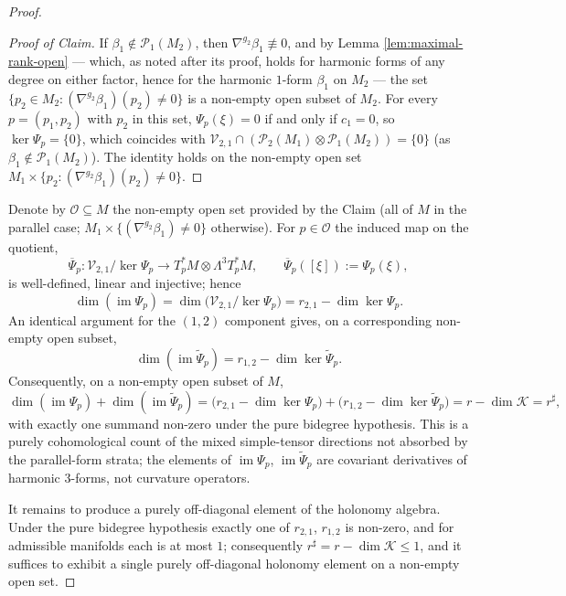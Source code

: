 \documentclass[11pt,reqno]{amsart}
\theoremstyle{plain}
\theoremstyle{definition}
\numberwithin{equation}{section}
\begin{document}
\begin{proof}
\begin{proof}[Proof of Claim]
If $\beta_1\notin\mathcal{P}_1(M_2)$, then $\nabla^{g_2}\beta_1\not\equiv 0$, and by
Lemma \ref{lem:maximal-rank-open} --- which, as noted after its proof, holds for
harmonic forms of any degree on either factor, hence for the harmonic $1$-form
$\beta_1$ on $M_2$ --- the set
$\{p_2\in M_2:(\nabla^{g_2}\beta_1)(p_2)\neq 0\}$ is a non-empty open subset of
$M_2$. For every $p=(p_1,p_2)$ with $p_2$ in this set, $\Psi_p(\xi)=0$ if and only if
$c_1=0$, so $\ker\Psi_p=\{0\}$, which coincides with
$\mathcal{V}_{2,1}\cap(\mathcal{P}_2(M_1)\otimes\mathcal{P}_1(M_2))=\{0\}$ (as
$\beta_1\notin\mathcal{P}_1(M_2)$). The identity holds on the non-empty open set
$M_1\times\{p_2:(\nabla^{g_2}\beta_1)(p_2)\neq 0\}$.
\end{proof}

Denote by $\mathcal{O}\subseteq M$ the non-empty open set provided by the Claim (all
of $M$ in the parallel case; $M_1\times\{(\nabla^{g_2}\beta_1)\neq 0\}$ otherwise).
For $p\in\mathcal{O}$ the induced map on the quotient,
\[
\overline{\Psi}_p:\mathcal{V}_{2,1}/\ker\Psi_p\longrightarrow
T_p^*M\otimes\Lambda^3 T_p^*M,\qquad \overline{\Psi}_p([\xi]):=\Psi_p(\xi),
\]
is well-defined, linear and injective; hence
\begin{equation}\label{eq:dimim}
\dim(\operatorname{im}\Psi_p)=\dim\bigl(\mathcal{V}_{2,1}/\ker\Psi_p\bigr)
=r_{2,1}-\dim\ker\Psi_p .
\end{equation}
An identical argument for the $(1,2)$ component gives, on a corresponding non-empty
open subset,
\begin{equation}\label{eq:dimim12}
\dim(\operatorname{im}\widetilde{\Psi}_p)=r_{1,2}-\dim\ker\widetilde{\Psi}_p .
\end{equation}
Consequently, on a non-empty open subset of $M$,
\[
\dim(\operatorname{im}\Psi_p)+\dim(\operatorname{im}\widetilde{\Psi}_p)
=\bigl(r_{2,1}-\dim\ker\Psi_p\bigr)+\bigl(r_{1,2}-\dim\ker\widetilde{\Psi}_p\bigr)
=r-\dim\mathcal{K}=r^\sharp,
\]
with exactly one summand non-zero under the pure bidegree hypothesis. This is a purely cohomological count of the mixed simple-tensor directions not absorbed by the parallel-form strata; the elements of $\operatorname{im}\Psi_p$,
$\operatorname{im}\widetilde{\Psi}_p$ are covariant derivatives of harmonic $3$-forms, not curvature operators.

It remains to produce a purely off-diagonal element of the holonomy algebra.  Under the pure bidegree hypothesis exactly one of $r_{2,1}$, $r_{1,2}$ is non-zero, and for admissible manifolds each is at most $1$; consequently $r^{\sharp}=r-\dim\mathcal{K}\leq 1$, and it suffices to exhibit a single purely off-diagonal holonomy element on a non-empty open set.


\end{proof}
\end{document}
